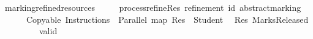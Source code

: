 \ marking{\isacharunderscore}refined{\isacharunderscore}resources{\isacharcolon}\isanewline
\ \ \ \ \isasymequiv\ process{\isacharunderscore}refineRes\ refinement\ id\ abstract{\isachardot}marking\isanewline
\ \ \ \ \ \ Copyable\ Instructions\ \isasymodot\ Parallel\ {\isacharparenleft}map\ {\isacharparenleft}Res\ {\isasymcirc}\ Student{\isacharparenright}\ \isanewline
{}\isasymrightarrow\ Res\ MarksReleased\isanewline
\ \ \ \ \ \ \ \ \ valid\ \isanewline
\ \ \ 
